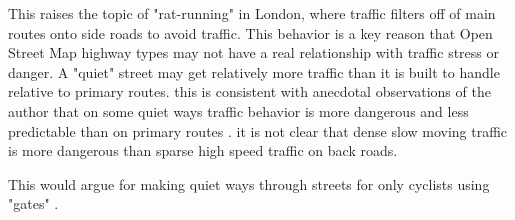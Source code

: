 This raises the topic of "rat-running" in London, where traffic filters off of main routes onto side roads to avoid traffic. This behavior is a key reason that Open Street Map highway types may not have a real relationship with traffic stress or danger. A "quiet" street may get relatively more traffic than it is built to handle relative to primary routes. this is consistent with anecdotal observations of the author that on some quiet ways traffic behavior is more dangerous and less predictable than on primary routes . it is not clear that dense slow moving traffic is more dangerous than sparse high speed traffic on back roads. 

This would argue for making quiet ways through streets for only cyclists using "gates" .